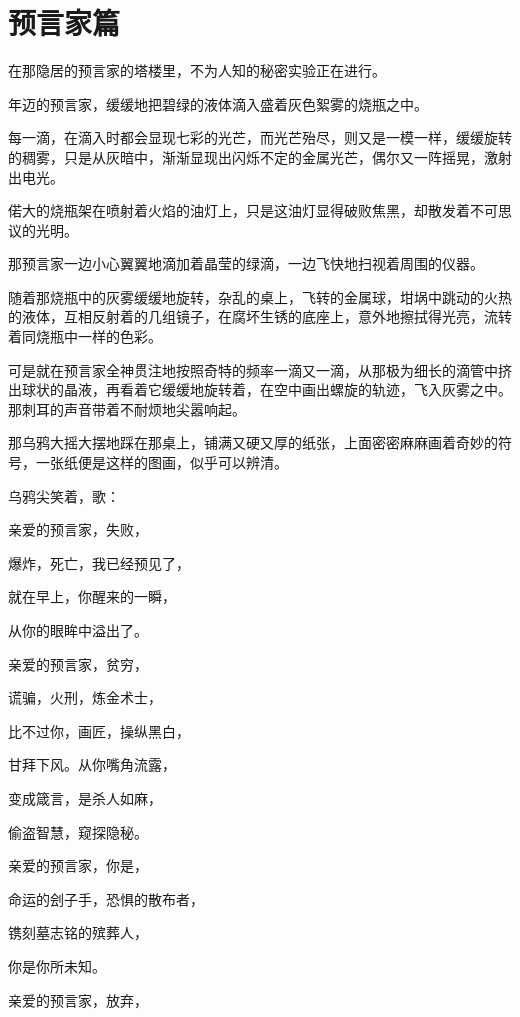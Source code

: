 \documentclass[UTF8]{article}
\begin{document}
\section{预言家篇}
\par 在那隐居的预言家的塔楼里，不为人知的秘密实验正在进行。
\\[0.6cm]
\par 年迈的预言家，缓缓地把碧绿的液体滴入盛着灰色絮雾的烧瓶之中。
\par 每一滴，在滴入时都会显现七彩的光芒，而光芒殆尽，则又是一模一样，缓缓旋转的稠雾，只是从灰暗中，渐渐显现出闪烁不定的金属光芒，偶尔又一阵摇晃，激射出电光。
\par 偌大的烧瓶架在喷射着火焰的油灯上，只是这油灯显得破败焦黑，却散发着不可思议的光明。
\par 那预言家一边小心翼翼地滴加着晶莹的绿滴，一边飞快地扫视着周围的仪器。
\par 随着那烧瓶中的灰雾缓缓地旋转，杂乱的桌上，飞转的金属球，坩埚中跳动的火热的液体，互相反射着的几组镜子，在腐坏生锈的底座上，意外地擦拭得光亮，流转着同烧瓶中一样的色彩。
\par 可是就在预言家全神贯注地按照奇特的频率一滴又一滴，从那极为细长的滴管中挤出球状的晶液，再看着它缓缓地旋转着，在空中画出螺旋的轨迹，飞入灰雾之中。那刺耳的声音带着不耐烦地尖嚣响起。
\\[0.6cm]
\par 那乌鸦大摇大摆地踩在那桌上，铺满又硬又厚的纸张，上面密密麻麻画着奇妙的符号，一张纸便是这样的图画，似乎可以辨清。
\par 乌鸦尖笑着，歌：
\\[0.6cm]
\par 亲爱的预言家，失败，
\par 爆炸，死亡，我已经预见了，
\par 就在早上，你醒来的一瞬，
\par 从你的眼眸中溢出了。
\par 亲爱的预言家，贫穷，
\par 谎骗，火刑，炼金术士，
\par 比不过你，画匠，操纵黑白，
\par 甘拜下风。从你嘴角流露，
\par 变成箴言，是杀人如麻，
\par 偷盗智慧，窥探隐秘。
\par 亲爱的预言家，你是，
\par 命运的刽子手，恐惧的散布者，
\par 镌刻墓志铭的殡葬人，
\par 你是你所未知。
\par 亲爱的预言家，放弃，
\end{document}
